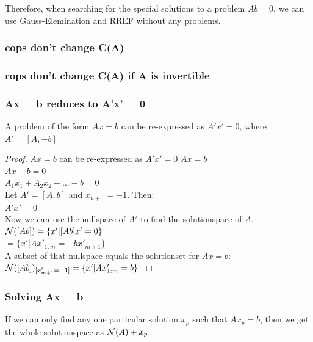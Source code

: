 Therefore, when searching for the special solutions to a problem $Ab = 0$, we can use Gauss-Elemination and RREF without any problems.

\subsubsection {cops don't change C(A)}

\subsubsection {rops don't change C(A) if A is invertible }

\subsubsection {Ax = b reduces to A'x' = 0}

\begin{theorem}
  A problem of the form $Ax = b$ can be re-expressed as $A'x' = 0$, where $A' = [A, -b]$ 
\end{theorem}

\begin{proof}
    \subprf {} {$A x = b$ can be re-expressed as $A'x' = 0$} {
        $ A x = b $ \\
        $ A x -b = 0 $ \\
        $ A_1 x_1 + A_2 x_2 + ... -b = 0 $ \\
        Let $A' = [A, b]$ and $x_{n+1} = -1$. Then: \\
        $ A' x' = 0 $ \\
        Now we can use the nullspace of $A'$ to find the solutionspace of $A$. \\
        $ \mathcal{N}([A b]) = \{x' | [A b]x' = 0\} $ \\
        $ = \{x' | A x'_{1:m} = -b x'_{m+1}\} $ \\
        A subset of that nullspace equals the solutionset for $A x = b$: \\
        $ \mathcal{N}([A b])_{[x'_{m+1} = -1]} = \{x'| A x'_{1:m} = b \} $ 
    }   
\end{proof}


\subsubsection{Solving Ax = b}

\begin{theorem}
  If we can only find any one particular solution $x_p$ such that $A x_p = b$, then we get the whole solutionspace as $\mathcal{N}(A) + x_p$.
\end{theorem}

